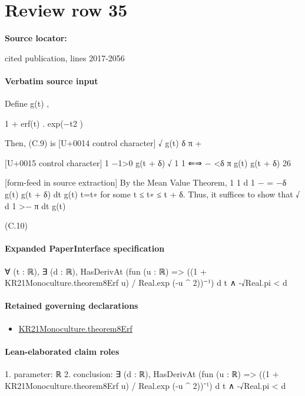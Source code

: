 \documentclass[10pt]{article}
\begin{document}
\section*{Review row 35}
\textbf{Source locator:} {\footnotesize\raggedright cited publication, lines 2017-\allowbreak{}2056\par}
\paragraph{Verbatim source input}
\begin{ReviewVerbatim}
Define
g(t) ,

1 + erf(t)
.
exp(−t2 )

Then, (C.9) is
[U+0014 control character]
√
g(t) δ π +

[U+0015 control character]
1
−1>0
g(t + δ)
√
1
1
⇐⇒
−
<δ π
g(t) g(t + δ)
26


[form-feed in source extraction]
By the Mean Value Theorem,
1
1
d 1
−
= −δ
g(t) g(t + δ)
dt g(t) t=t∗
for some t ≤ t∗ ≤ t + δ. Thus, it suffices to show that
√
d 1
>− π
dt g(t)

(C.10)
\end{ReviewVerbatim}



\paragraph{Expanded PaperInterface specification}
\begin{ReviewVerbatim}
∀ (t : ℝ),
  ∃ (d : ℝ), HasDerivAt (fun (u : ℝ) => ((1 + KR21Monoculture.theorem8Erf u) / Real.exp (-u ^ 2))⁻¹) d t ∧ -√Real.pi < d
\end{ReviewVerbatim}

\paragraph{Retained governing declarations}
\begin{itemize}\raggedright
\item \hyperlink{paper-prerequisite-89a4972e4c2bbebd}{KR21\allowbreak{}Monoculture.\allowbreak{}theorem8\allowbreak{}Erf}
\end{itemize}
\paragraph{Lean-elaborated claim roles}\begin{ReviewVerbatim}
1. parameter: ℝ
2. conclusion: ∃ (d : ℝ), HasDerivAt (fun (u : ℝ) => ((1 + KR21Monoculture.theorem8Erf u) / Real.exp (-u ^ 2))⁻¹) d t ∧ -√Real.pi < d
\end{ReviewVerbatim}
\end{document}

